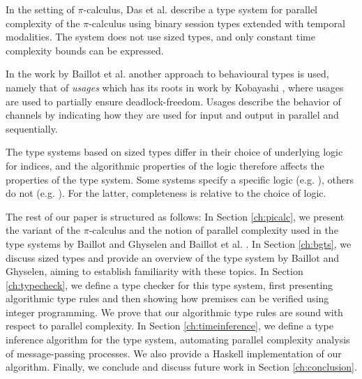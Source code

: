 In the setting of $\pi$-calculus, Das et al. \cite{DasEtAl2018} describe a type system for parallel complexity of the $\pi$-calculus using binary session types extended with temporal modalities. The system does not use sized types, and only constant time complexity bounds can be expressed.

In the work by Baillot et al. another approach to behavioural types is used, namely that of \textit{usages} which has its roots in work by Kobayashi \cite{Kobayashi1998}, where usages are used to partially ensure deadlock-freedom. Usages describe the behavior of channels by indicating how they are used for input and output in parallel and sequentially. 

The type systems based on sized types differ in their choice of
underlying logic for indices, and the algorithmic properties of the
logic therefore affects the properties of the type system. Some
systems specify a specific logic (e.g.
\cite{HughesEtAl1996,HofmannAndJost2003,HofmannAndHoffmann2010,HoffmannEtAl2012}),
others do not (e.g.
\cite{BaillotGhyselen2021,BaillotEtAl2021,DalLagoGaboardi2011}). For
the latter, completeness is relative to the choice of logic.
%

The rest of our paper is structured as follows: In Section \ref{ch:picalc}, we present the variant of the $\pi$-calculus and the notion of parallel complexity used in the type systems by Baillot and Ghyselen \cite{BaillotGhyselen2021} and Baillot et al. \cite{BaillotEtAl2021}. In Section \ref{ch:bgts}, we discuss sized types and provide an overview of the type system by Baillot and Ghyselen, aiming to establish familiarity with these topics. In Section \ref{ch:typecheck}, we define a type checker for this type system, first presenting algorithmic type rules and then showing how premises can be verified using integer programming. We prove that our algorithmic type rules are sound with respect to parallel complexity. In Section \ref{ch:timeinference}, we define a type inference algorithm for the type system, automating parallel complexity analysis of message-passing processes. We also provide a Haskell implementation of our algorithm. Finally, we conclude and discuss future work in Section \ref{ch:conclusion}.

